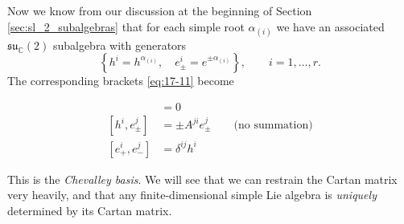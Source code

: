 Now we know from our discussion at the beginning of Section \ref{sec:sl_2_subalgebras} that for each simple root $\alpha_{(i)}$ we have an associated $\mathfrak{su}_{\mathbb{C}}(2)$ subalgebra with generators
\begin{equation}
  \left\{ h^{i} = h^{\alpha_{(i)}}, \quad e^{i}_{\pm} = e^{\pm \alpha_{(i)}} \right\}, \qquad i = 1, \dots, r.
\end{equation}
The corresponding brackets \eqref{eq:17-11} become
\begin{simplebox}
  \begin{align}
    [h^{i}, h^{j}] &= 0 \\
    [h^{i}, e^{j}_\pm] &= \pm A^{ji} e^{j}_\pm \qquad \text{(no summation)} \\
    [e_+^{i}, e^{j}_-] &= \delta^{ij} h^{i}
  \end{align}
\end{simplebox}
This is the \emph{Chevalley basis}.
We will see that we can restrain the Cartan matrix very heavily, and that any finite-dimensional simple Lie algebra is \emph{uniquely} determined by its Cartan matrix.

